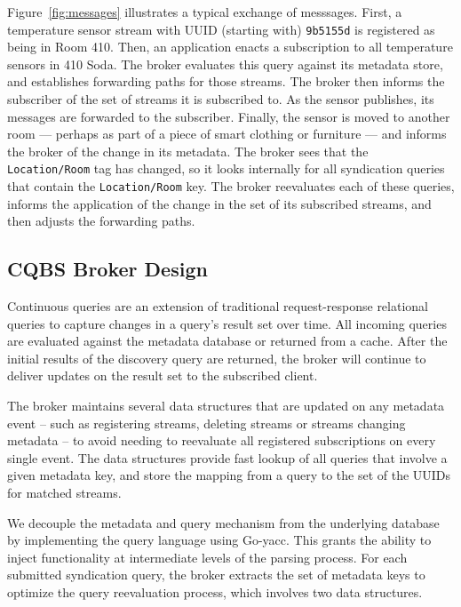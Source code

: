 Figure~\ref{fig:messages} illustrates a typical exchange of messsages.
First, a temperature sensor stream with UUID (starting with) \texttt{9b5155d} is registered as being in Room 410.
Then, an application enacts a subscription to all temperature sensors in 410 Soda.
The broker evaluates this query against its metadata store, and establishes forwarding paths for those streams.
The broker then informs the subscriber of the set of streams it is subscribed to.
As the sensor publishes, its messages are forwarded to the subscriber.
Finally, the sensor is moved to another room --- perhaps as part of a piece of smart clothing or furniture --- and informs the broker of the change in its metadata.
The broker sees that the \texttt{Location/Room} tag has changed, so it looks internally for all syndication queries that contain the \texttt{Location/Room} key.
The broker reevaluates each of these queries, informs the application of the change in the set of its subscribed streams, and then adjusts the forwarding paths.

\subsection{CQBS Broker Design}

Continuous queries are an extension of traditional request-response relational queries to capture changes in a query's result set over time.
All incoming queries are evaluated against the metadata database or returned from a cache.
After the initial results of the discovery query are returned, the broker will continue to deliver updates on the result set to the subscribed client.

The broker maintains several data structures that are updated on any metadata event -- such as registering streams, deleting streams or streams changing metadata -- to avoid needing to reevaluate all registered subscriptions on every single event.
The data structures provide fast lookup of all queries that involve a given metadata key, and store the mapping from a query to the set of the UUIDs for matched streams.

We decouple the metadata and query mechanism from the underlying database by implementing the query language using Go-yacc.
This grants the ability to inject functionality at intermediate levels of the parsing process.
For each submitted syndication query, the broker extracts the set of metadata keys to optimize the query reevaluation process, which involves two data structures.

